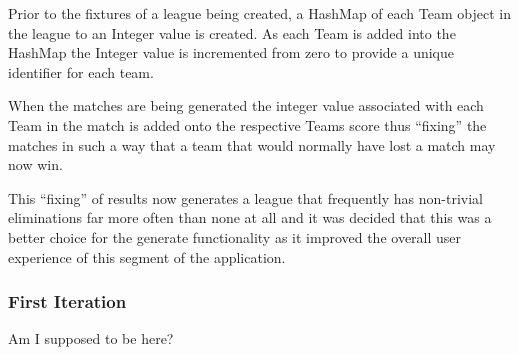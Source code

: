 Prior to the fixtures of a league being created, a HashMap of each
Team object in the league to an Integer value is created. As each Team
is added into the HashMap the Integer value is incremented from zero to
provide a unique identifier for each team.

When the matches are being generated the integer value
associated with each Team in the match is added onto the respective
Teams score thus ``fixing'' the matches in such a way that a team that
would normally have lost a match may now win. 

This ``fixing'' of results now generates a league that frequently has
non-trivial eliminations far more often than none at all and it was
decided that this was a better choice for the generate functionality
as it improved the overall user experience of this segment of the
application. 

\subsubsection{First Iteration}

Am I supposed to be here?